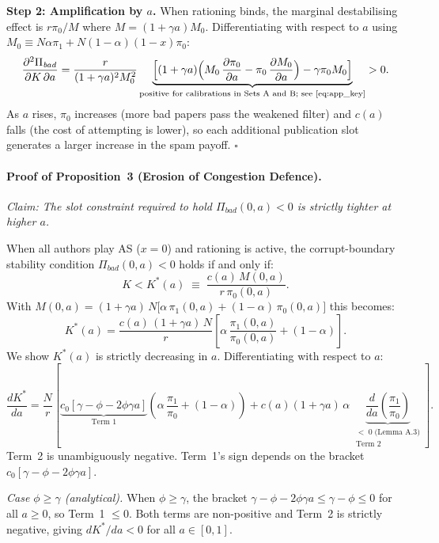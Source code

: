 \documentclass{article}
\begin{document}
\noindent\textbf{Step 2: Amplification by $a$.}
When rationing binds, the marginal destabilising effect is $r\pi_0/M$ where $M=(1+\gamma a)M_0$.
Differentiating with respect to $a$ using $M_0 \equiv N\alpha\pi_1 + N(1-\alpha)(1-x)\pi_0$:
\[
  \frac{\partial^2\Pi_{\mathit{bad}}}{\partial K\,\partial a}
  = \frac{r}{(1+\gamma a)^2 M_0^2}\underbrace{\Bigl[(1+\gamma a)\Bigl(M_0\,\frac{\partial\pi_0}{\partial a}
    - \pi_0\,\frac{\partial M_0}{\partial a}\Bigr) - \gamma\pi_0 M_0\Bigr]}_{\text{positive for calibrations in Sets A and B; see \eqref{eq:app_key}}} > 0.
\]
As $a$ rises, $\pi_0$ increases (more bad papers pass the weakened filter) and $c(a)$ falls (the cost of attempting is lower), so each additional publication slot generates a larger increase in the spam payoff.
\hfill$\square$

\bigskip

\paragraph{Proof of Proposition~3 (Erosion of Congestion Defence).}

\noindent\textit{Claim: The slot constraint required to hold $\Pi_{\mathit{bad}}(0,a) < 0$ is strictly tighter at higher $a$.}

\medskip
When all authors play AS ($x=0$) and rationing is active, the corrupt-boundary stability condition $\Pi_{\mathit{bad}}(0,a) < 0$ holds if and only if:
\[
  K < K^*(a) \;\equiv\; \frac{c(a)\,M(0,a)}{r\,\pi_0(0,a)}.
\]
With $M(0,a) = (1+\gamma a)\,N\bigl[\alpha\,\pi_1(0,a) + (1-\alpha)\,\pi_0(0,a)\bigr]$ this becomes:
\[
  K^*(a) = \frac{c(a)\,(1+\gamma a)\,N}{r}\!\left[\alpha\,\frac{\pi_1(0,a)}{\pi_0(0,a)} + (1-\alpha)\right].
\]
We show $K^*(a)$ is strictly decreasing in $a$.
Differentiating with respect to $a$:
\[
  \frac{dK^*}{da}
  = \frac{N}{r}\!\left[
      \underbrace{c_0[\gamma-\phi-2\phi\gamma a]}_{\text{Term 1}}\!\left(\alpha\,\frac{\pi_1}{\pi_0}+(1-\alpha)\right)
      + c(a)(1+\gamma a)\,\alpha\;\underbrace{\frac{d}{da}\!\left(\frac{\pi_1}{\pi_0}\right)}_{\substack{<\;0\;\text{(Lemma A.3)}\\\text{Term 2}}}
    \right].
\]
Term~2 is unambiguously negative.
Term~1's sign depends on the bracket $c_0[\gamma-\phi-2\phi\gamma a]$.

\medskip
\noindent\textit{Case $\phi \geq \gamma$ (analytical).}
When $\phi \geq \gamma$, the bracket $\gamma-\phi-2\phi\gamma a \leq \gamma-\phi \leq 0$ for all $a\geq 0$,
so Term~1 $\leq 0$.
Both terms are non-positive and Term~2 is strictly negative, giving $dK^*/da < 0$ for all $a\in[0,1]$.
\end{document}
